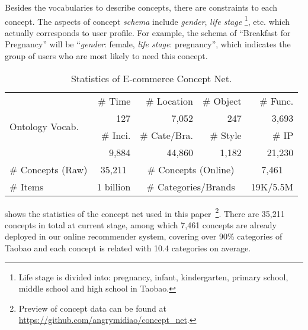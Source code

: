 



Besides the vocabularies to describe concepts, there are constraints to each concept. 
The aspects of concept \textit{schema} include
 \textit{gender}, \textit{life stage} \footnote{Life stage is divided into: pregnancy, infant, kindergarten, primary school, middle school and high school in Taobao.}, etc.
which actually corresponds to user profile.
For example, the schema of ``Breakfast for Pregnancy'' will be ``\textit{gender}: female, \textit{life stage}: pregnancy'', which indicates the group of users who are most likely to need this concept.

\begin{table}[th]
	\centering
	\small
	\begin{tabular}{|l|r|r|r|r|}
		\hline
		\multirow{4}{*}{Ontology Vocab.} 
		&\# Time &\# Location &\# Object &\# Func.  \\
		\cline{2-5}
		& 127 & 7,052 & 247 & 3,693 \\
		\cline{2-5}
		&\# Inci. & \# Cate/Bra. & \# Style &\# IP  \\
		\cline{2-5}
		& 9,884 & 44,860 & 1,182 & 21,230 \\
		\hline
		\# Concepts (Raw) & \multicolumn{1}{c|}{35,211} &
		\multicolumn{2}{c|}{\# Concepts (Online)} & \multicolumn{1}{c|}{7,461} \\ 
		\hline
		\# Items & \multicolumn{1}{c|}{1 billion} &
		\multicolumn{2}{c|}{\# Categories/Brands} & \multicolumn{1}{c|}{19K/5.5M} \\ 
		\hline
	\end{tabular}
	\caption{Statistics of E-commerce Concept Net.}
	\label{tab:data}
\end{table}


 shows the statistics of the concept net used in this
paper~\footnote{Preview of concept data can be found at \url{https://github.com/angrymidiao/concept_net}.}.
There are 35,211 concepts in total at current stage, 
among which 7,461 concepts are already deployed in our online recommender system, covering over 90\% categories of Taobao and each concept is related with 10.4 categories on average.

